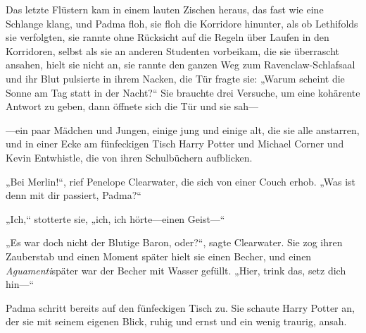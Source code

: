 Das letzte Flüstern kam in einem lauten Zischen heraus, das fast wie eine Schlange klang, und Padma floh, sie floh die Korridore hinunter, als ob Lethifolds sie verfolgten, sie rannte ohne Rücksicht auf die Regeln über Laufen in den Korridoren, selbst als sie an anderen Studenten vorbeikam, die sie überrascht ansahen, hielt sie nicht an, sie rannte den ganzen Weg zum Ravenclaw-Schlafsaal und ihr Blut pulsierte in ihrem Nacken, die Tür fragte sie: „Warum scheint die Sonne am Tag statt in der Nacht?“ Sie brauchte drei Versuche, um eine kohärente Antwort zu geben, dann öffnete sich die Tür und sie sah—

—ein paar Mädchen und Jungen, einige jung und einige alt, die sie alle anstarren, und in einer Ecke am fünfeckigen Tisch Harry Potter und Michael Corner und Kevin Entwhistle, die von ihren Schulbüchern aufblicken.

„Bei Merlin!“, rief Penelope Clearwater, die sich von einer Couch erhob. „Was ist denn mit dir passiert, Padma?“

„Ich,“ stotterte sie, „ich, ich hörte—einen Geist—“

„Es war doch nicht der Blutige Baron, oder?“, sagte Clearwater. Sie zog ihren Zauberstab und einen Moment später hielt sie einen Becher, und einen \emph{Aguamenti}später war der Becher mit Wasser gefüllt. „Hier, trink das, setz dich hin—“

Padma schritt bereits auf den fünfeckigen Tisch zu. Sie schaute Harry Potter an, der sie mit seinem eigenen Blick, ruhig und ernst und ein wenig traurig, ansah.

